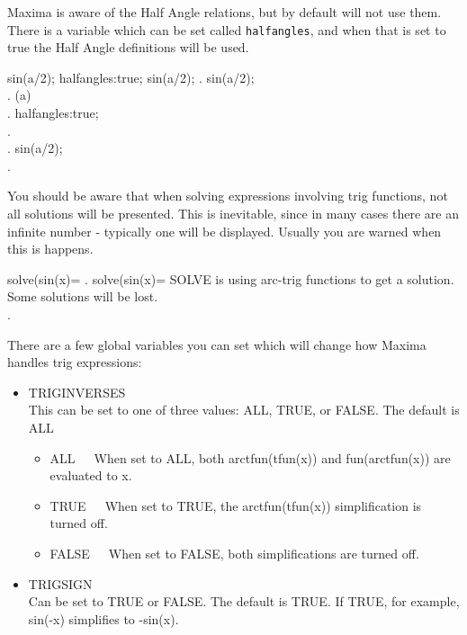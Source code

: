 Maxima is aware of the Half Angle relations, but by default will not use
them.  There is a variable which can be set called \texttt{halfangles}, and when
that is set to true the Half Angle definitions will be used.

\beginmaximasession
sin(a/2);
halfangles:true;
sin(a/2);
\maximatexsession
{}.  sin(a/2); \\
.   \sin \left({{a}}\right) \\
.  halfangles:true; \\
.    \\
.  sin(a/2); \\
.   {{}} \\
\endmaximasession

You should be aware that when solving expressions 
involving trig functions, not all solutions will be presented.  This
is inevitable, since in many cases there are an infinite number - 
typically one will be displayed.  Usually you are warned when this
is happens.

\beginmaximasession
solve(sin(x)=%
\maximatexsession
{}.  solve(sin(x)=%
\p 
SOLVE is using arc-trig functions to get a solution.
Some solutions will be lost.
 \\
.   \left[ x=\arcsin \left({{\pi}\over{2}}\right) \right]  \\
\endmaximasession

There are a few global variables you can set which will change how
Maxima handles trig expressions:

\begin{itemize}
\item TRIGINVERSES \\
      This can be set to one of three values:  ALL, TRUE, or FALSE. The
      default is ALL
      \begin{itemize}
       \item ALL~~~When set to ALL, both arctfun(tfun(x)) and
            fun(arctfun(x)) are evaluated to x.
       \item TRUE~~~When set to TRUE, the arctfun(tfun(x)) simplification
             is turned off.
       \item FALSE~~~When set to FALSE, both simplifications are turned
             off.
      \end{itemize}
\item TRIGSIGN \\
      Can be set to TRUE or FALSE.  The default is TRUE.  If TRUE,
      for example, sin(-x) simplifies to -sin(x).
\end{itemize}

